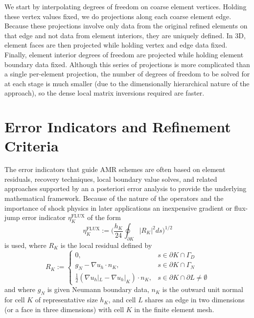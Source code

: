 We start by interpolating degrees of freedom on coarse element
vertices.  Holding these vertex values fixed, we do projections along
each coarse element edge.  Because these projections involve only data
from the original refined elements on that edge and not data from
element interiors, they are uniquely defined.  In 3D, element faces
are then projected while holding vertex and edge data fixed.  Finally,
element interior degrees of freedom are projected while holding
element boundary data fixed.  Although this series of projections is
more complicated than a single per-element projection, the number of
degrees of freedom to be solved for at each stage is much smaller (due
to the dimensionally hierarchical nature of the approach), so the
dense local matrix inversions required are faster.



\section{Error Indicators and Refinement Criteria\label{sec:error_indicators}}
The error indicators that guide AMR schemes are often based on element
residuals, recovery techniques, local boundary value solves, and
related approaches supported by an a posteriori error analysis to
provide the underlying mathematical framework.  Because of the nature of the operators and the importance of shock physics in later applications an inexpensive gradient or flux-jump error indicator $\eta^{\text{FLUX}}_K$ of the
form~\cite{kelly_error_1983}
\begin{equation}
  \eta^{\text{FLUX}}_K := \Big( \frac{h_K}{24} \oint_{\partial K} |R_K|^2 ds \Big)^{1/2}
  \label{eqn:flux_indicator}
\end{equation}
is used, where $R_K$ is the local residual defined by
\begin{equation}
  R_K := \left\{
    \begin{array}{cl}
      0, & s \in \partial K \cap \Gamma_D \\
      g_N - \nabla u_h \cdot n_K, & s \in \partial K \cap \Gamma_N \\
      \frac{1}{2}(\nabla u_h|_L - \nabla u_h|_K) \cdot n_K, & s \in \partial K \cap \partial L \neq \emptyset
    \end{array}
    \right.
  \label{eqn:local_element_residual}
\end{equation}
and where $g_N$ is given Neumann boundary data, $n_K$ is the outward unit
normal for cell $K$ of representative size $h_K$, and cell $L$ shares an edge in two dimensions (or a face in three dimensions) with cell $K$
in the finite element mesh.

